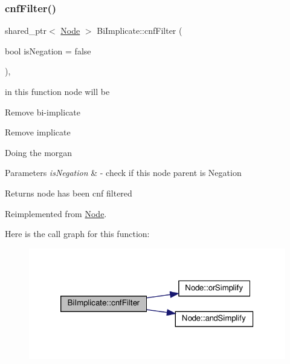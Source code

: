 \subsubsection{\texorpdfstring{cnf\+Filter()}{cnfFilter()}}
{\footnotesize\ttfamily shared\+\_\+ptr$<$ \hyperlink{class_node}{Node} $>$ Bi\+Implicate\+::cnf\+Filter (\begin{DoxyParamCaption}\item[{bool}]{is\+Negation = {\ttfamily false} }\end{DoxyParamCaption})\hspace{0.3cm}{\ttfamily [override]}, {\ttfamily [virtual]}}



in this function node will be 


\begin{DoxyItemize}
\item Remove bi-\/implicate
\item Remove implicate
\item Doing the morgan 
\begin{DoxyParams}{Parameters}
{\em is\+Negation} & -\/ check if this node parent is Negation \\
\hline
\end{DoxyParams}
\begin{DoxyReturn}{Returns}
node has been cnf filtered 
\end{DoxyReturn}

\end{DoxyItemize}

Reimplemented from \hyperlink{class_node_ab5b01fd3c4efe0f2eaf7fc41653359b7}{Node}.

Here is the call graph for this function\+:\nopagebreak
\begin{figure}[H]
\begin{center}
\leavevmode
\includegraphics[width=320pt]{d5/da3/class_bi_implicate_a3f79e7340ff831b0bb927d8a70414ac3_cgraph}
\end{center}
\end{figure}
\mbox{\label{class_bi_implicate_a41c9d9c53bf05cdde330ec8df07fde31}} 
